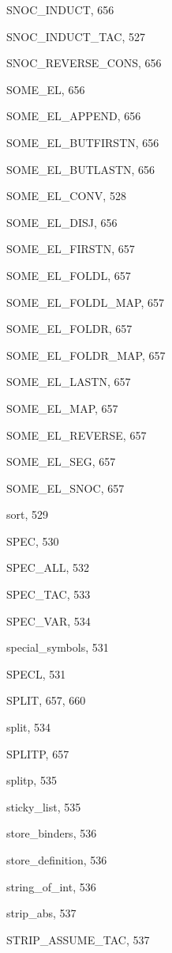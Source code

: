 \begin{theindex}
  \item {\ptt SNOC\_INDUCT}, 656
  \item {\ptt SNOC\_INDUCT\_TAC}, 527
  \item {\ptt SNOC\_REVERSE\_CONS}, 656
  \item {\ptt SOME\_EL}, 656
  \item {\ptt SOME\_EL\_APPEND}, 656
  \item {\ptt SOME\_EL\_BUTFIRSTN}, 656
  \item {\ptt SOME\_EL\_BUTLASTN}, 656
  \item {\ptt SOME\_EL\_CONV}, 528
  \item {\ptt SOME\_EL\_DISJ}, 656
  \item {\ptt SOME\_EL\_FIRSTN}, 657
  \item {\ptt SOME\_EL\_FOLDL}, 657
  \item {\ptt SOME\_EL\_FOLDL\_MAP}, 657
  \item {\ptt SOME\_EL\_FOLDR}, 657
  \item {\ptt SOME\_EL\_FOLDR\_MAP}, 657
  \item {\ptt SOME\_EL\_LASTN}, 657
  \item {\ptt SOME\_EL\_MAP}, 657
  \item {\ptt SOME\_EL\_REVERSE}, 657
  \item {\ptt SOME\_EL\_SEG}, 657
  \item {\ptt SOME\_EL\_SNOC}, 657
  \item {\ptt sort}, 529
  \item {\ptt SPEC}, 530
  \item {\ptt SPEC\_ALL}, 532
  \item {\ptt SPEC\_TAC}, 533
  \item {\ptt SPEC\_VAR}, 534
  \item {\ptt special\_symbols}, 531
  \item {\ptt SPECL}, 531
  \item {\ptt SPLIT}, 657, 660
  \item {\ptt split}, 534
  \item {\ptt SPLITP}, 657
  \item {\ptt splitp}, 535
  \item {\ptt sticky\_list}, 535
  \item {\ptt store\_binders}, 536
  \item {\ptt store\_definition}, 536
  \item {\ptt string\_of\_int}, 536
  \item {\ptt strip\_abs}, 537
  \item {\ptt STRIP\_ASSUME\_TAC}, 537

\end{theindex}
